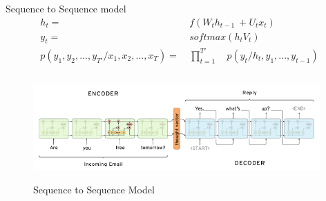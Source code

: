 \documentclass{beamer}
\begin{document}
\begin{frame}{Sequence to Sequence model}
	\begin{align*}
		h_{t} =&\ f(W_{t}h_{t-1}\ + U_{t}x_{t}) \\
		y_{t} =&\ softmax(h_{t}V_{t}) \\
		p(y_1,y_2,...,y_{T'}/x_1,x_2,...,x_T) =&\ \prod_{t=1}^{T'}\quad p(y_t/h_{t}, y_1,...,y_{t-1})
	\end{align*}

	\begin{figure}
	   \includegraphics[width=11cm, height=4cm]{figs/encoder_decoder_rnn.png}
	   \caption{Sequence to Sequence Model}
	\end{figure}
\end{frame}
\end{document}
